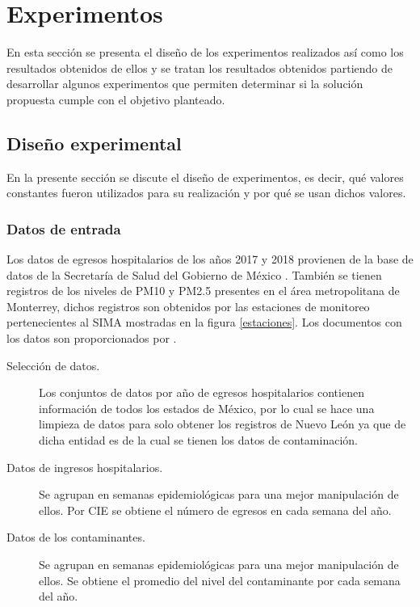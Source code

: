 \documentclass[3p,times]{elsarticle}
\begin{document}
\clearpage
\section{Experimentos}

En esta sección se presenta el diseño de los experimentos realizados así como los resultados obtenidos de ellos y se tratan los resultados obtenidos partiendo de desarrollar algunos experimentos que permiten determinar si la solución propuesta cumple con el objetivo planteado.

\subsection{Diseño experimental}
En la presente sección se discute el diseño de experimentos, es decir, qué valores constantes fueron utilizados para su realización y por qué se usan dichos valores.

\subsubsection{Datos de entrada}
Los datos de egresos hospitalarios de los años 2017 y 2018 provienen de la base de datos de la Secretaría de Salud del Gobierno de México \cite{f1}. También se tienen registros de los niveles de PM10 y PM2.5 presentes en el área metropolitana de Monterrey, dichos registros son obtenidos por las estaciones de monitoreo pertenecientes al SIMA \cite{f2} mostradas en la figura \ref{estaciones}. Los documentos con los datos son proporcionados por \citet{f3}.

\begin{description}
\item [Selección de datos.] {Los conjuntos de datos por año de egresos hospitalarios contienen información de todos los estados de México, por lo cual se hace una limpieza de datos para solo obtener los registros de Nuevo León ya que de dicha entidad es de la cual se tienen los datos de contaminación.}
\item [Datos de ingresos hospitalarios.] {Se agrupan en semanas epidemiológicas para una mejor manipulación de ellos. Por CIE se obtiene el número de egresos en cada semana del año.}
\item [Datos de los contaminantes.] {Se agrupan en semanas epidemiológicas para una mejor manipulación de ellos. Se obtiene el promedio del nivel del contaminante por cada semana del año.}
\end{description}
\end{document}

